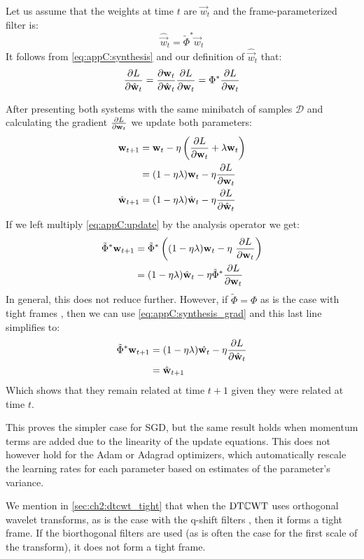 Let us assume that the weights at time $t$ are $\vec{w}_t$ and the frame-parameterized
filter is:
\begin{equation}
  \hat{\vec{w}}_t = \tilde{\Phi}^* \vec{w}_t \label{eq:appC:initial_condition}
 \end{equation}
 It follows from \eqref{eq:appC:synthesis} and our definition of
 $\hat{\vec{w}}_t$ that:
\begin{equation}
  \frac{\partial L}{\partial \hat{\mathbf{w}}_t} =\frac{\partial \mathbf{w}_t}{\partial \hat{\mathbf{w}}_t} \frac{\partial L}{\partial \mathbf{w}_t} =  {\Phi}^* \frac{\partial L}{\partial \mathbf{w}_t} \label{eq:appC:synthesis_grad}
\end{equation}


After presenting both systems with the same minibatch of samples $\mathcal{D}$
and calculating the gradient $\frac{\partial L}{\partial \mathbf{w}_t}$ we update both parameters:
\begin{align}
  \mathbf{w}_{t+1} & =  \mathbf{w}_t - \eta \left( \frac{\partial L}{\partial \mathbf{w}_t} + \lambda \mathbf{w}_t \right) \\
                &= (1-\eta\lambda)\mathbf{w}_t - \eta \frac{\partial L}{\partial \mathbf{w}_t} \label{eq:appC:update} \\
  \hat{\mathbf{w}}_{t+1} & = (1-\eta\lambda)\hat{\mathbf{w}}_t - \eta \frac{\partial L}{\partial \hat{\mathbf{w}}_t} 
\end{align}
If we left multiply \eqref{eq:appC:update} by the analysis operator we get:
\begin{align}
  \tilde{\Phi}^* \mathbf{w}_{t+1} &= \tilde{\Phi}^* \left( (1-\eta\lambda){\mathbf{w}}_t - \eta\ \frac{\partial L}{\partial {\mathbf{w}}_t}\right) \\       
                               & =  (1-\eta\lambda)\hat{\mathbf{w}}_t - \eta \tilde{\Phi}^* \frac{\partial L}{\partial {\mathbf{w}}_t} 
\end{align}
In general, this does not reduce further. However, if $\tilde{\Phi} =
{\Phi}$ as is the case with tight frames \cite{kovacevic_introduction_2008},
then we can use \eqref{eq:appC:synthesis_grad} and this last line simplifies to:
\begin{align}
  \tilde{\Phi}^* \mathbf{w}_{t+1} &= (1-\eta\lambda)\hat{\mathbf{w}_t} - \eta \frac{\partial L}{\partial \hat{\mathbf{w}}_t} \\
                               &= \hat{\mathbf{w}}_{t+1}
\end{align}
Which shows that they remain related at time $t+1$ given they were
related at time $t$.

This proves the simpler case for SGD, but the same result holds when
momentum terms are added due to the linearity of the update equations. This does
not however hold for the Adam \cite{kingma_adam:_2014} or Adagrad
\cite{duchi_adaptive_2011} optimizers, which automatically rescale the learning
rates for each parameter based on estimates of the parameter's variance.

We mention in \autoref{sec:ch2:dtcwt_tight} that when the $\mathrm{DT}\mathbb{C}\mathrm{WT}$ uses orthogonal
wavelet transforms, as is the case with the q-shift filters \cite{kingsbury_dual-tree_2000}, then it
forms a tight frame. If the biorthogonal filters are used (as is often the case
for the first scale of the transform), it does not form a tight frame.
